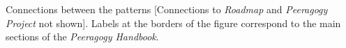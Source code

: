 Connections between the patterns [Connections to \emph{Roadmap} and \emph{Peeragogy Project} not shown].  Labels at the borders of the figure correspond to the main sections of the \emph{Peeragogy Handbook}.